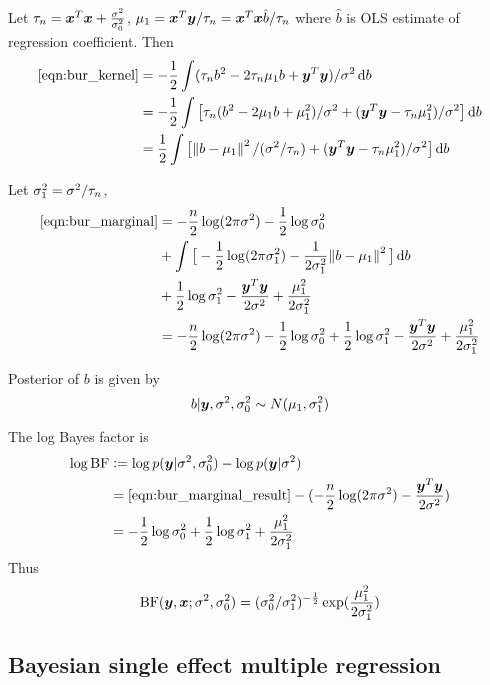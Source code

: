 Let $\tau_n = \bm x^T\bm x + \frac{\sigma^2}{\sigma^2_0}$, $\mu_1 = \bm x^T\bm y / \tau_n = \bm x^T\bm x \hat{b} / \tau_n$ where $\hat{b}$ is OLS estimate of regression coefficient. Then
\begin{align}
    \eqref{eqn:bur_kernel} &= -\frac{1}{2}\int (\tau_nb^2 - 2\tau_n \mu_1 b + \vy^T\vy) / \rv \dif b \\ 
    &= -\frac{1}{2}\int \big[ \tau_n(b^2 - 2\mu_1 b + \mu_1^2) / \rv + (\vy^T\vy - \tau_n\mu_1^2) / \rv \big] \dif b \\ 
    &= \frac{1}{2} \int \big[\norm{b-\mu_1}^2 / (\rv/\tau_n) + (\vy^T\vy - \tau_n\mu_1^2) / \rv \big] \dif b
\end{align}

Let $\sigma^2_1 = \sigma^2 / \tau_n$, 
\begin{align}
    \eqref{eqn:bur_marginal} &= -\frac{n}{2}\log(2\pi\rv) - \frac{1}{2} \log \rv_0 \\
    &+ \int \big[-\frac{1}{2} \log(2\pi\rv_1) - \frac{1}{2\rv_1}\norm{b-\mu_1}^2 \big] \dif b \\
    &+ \frac{1}{2}\log \rv_1 - \frac{\vy^T\vy}{2\rv} + \frac{\mu_1^2}{2\rv_1} \\
    &= -\frac{n}{2}\log(2\pi\rv) - \frac{1}{2} \log \rv_0 + \frac{1}{2}\log \rv_1 - \frac{\vy^T\vy}{2\rv} + \frac{\mu_1^2}{2\rv_1} \label{eqn:bur_marginal_result}
\end{align}

Posterior of $b$ is given by
\begin{equation}
b | \bm y, \sigma^2, \sigma^2_0 \sim N(\mu_1, \sigma^2_1)
\end{equation}

The log Bayes factor is
\begin{align}
    \log \text{BF} & := \log p(\bm y|\sigma^2, \sigma^2_0) - \log p(\bm y | \sigma^2) \\
    &= \eqref{eqn:bur_marginal_result} - (-\frac{n}{2}\log(2\pi\sigma^2) - \frac{\bm y^T\bm y}{2\sigma^2}) \\
    &= - \frac{1}{2} \log \sigma^2_0 + \frac{1}{2}\log \sigma^2_1 + \frac{\mu_1^2}{2\sigma^2_1}
\end{align}
Thus 
\begin{equation}
\text{BF}(\bm y, \bm x; \sigma^2, \sigma^2_0) = (\sigma^2_0/\sigma^2_1)^{-\frac{1}{2}}\exp(\frac{\mu_1^2}{2\sigma^2_1})
\end{equation}

\subsection{Bayesian single effect multiple regression} \label{sec:bser}

